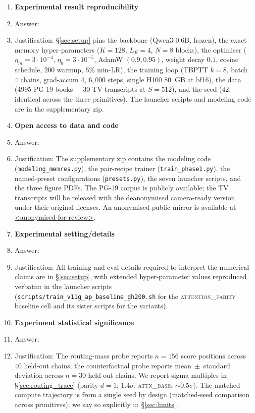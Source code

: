 \begin{enumerate}
\item {\bf Experimental result reproducibility}
    \item[] Answer: \answerYes{}
    \item[] Justification: \S\ref{sec:setup} pins the backbone (Qwen3-0.6B, frozen), the exact memory hyper-parameters ($K{=}128$, $L_E{=}4$, $N{=}8$ blocks), the optimiser ($\eta_m{=}3{\cdot}10^{-4}$, $\eta_b{=}3{\cdot}10^{-5}$, AdamW $(0.9, 0.95)$, weight decay $0.1$, cosine schedule, $200$ warmup, $5\%$ min-LR), the training loop (TBPTT $k{=}8$, batch $4$ chains, grad-accum $4$, $6{,}000$ steps, single H100 80~GB at bf16), the data (4995 PG-19 books + 30 TV transcripts at $S{=}512$), and the seed ($42$, identical across the three primitives).  The launcher scripts and modeling code are in the supplementary zip.

\item {\bf Open access to data and code}
    \item[] Answer: \answerYes{}
    \item[] Justification: The supplementary zip contains the modeling code (\texttt{modeling\_memres.py}), the pair-recipe trainer (\texttt{train\_phase1.py}), the named-preset configurations (\texttt{presets.py}), the seven launcher scripts, and the three figure PDFs.  The PG-19 corpus is publicly available; the TV transcripts will be released with the deanonymised camera-ready version under their original licenses.  An anonymised public mirror is available at \url{<anonymised-for-review>}.

\item {\bf Experimental setting/details}
    \item[] Answer: \answerYes{}
    \item[] Justification: All training and eval details required to interpret the numerical claims are in \S\ref{sec:setup}, with extended hyper-parameter values reproduced verbatim in the launcher scripts (\texttt{scripts/train\_v11g\_ap\_baseline\_gh200.sh} for the \textsc{attention\_parity} baseline cell and its sister scripts for the variants).

\item {\bf Experiment statistical significance}
    \item[] Answer: \answerYes{}
    \item[] Justification: The routing-mass probe reports $n=156$ score positions across $40$ held-out chains; the counterfactual probe reports mean~$\pm$~standard deviation across $n=30$ held-out chains.  We report sigma multiples in \S\ref{sec:routing_trace} (parity $d{=}1$: $1.4\sigma$; \textsc{attn\_base}: ${\sim}0.5\sigma$).  The matched-compute trajectory is from a single seed by design (matched-seed comparison across primitives); we say so explicitly in \S\ref{sec:limits}.


\end{enumerate}
